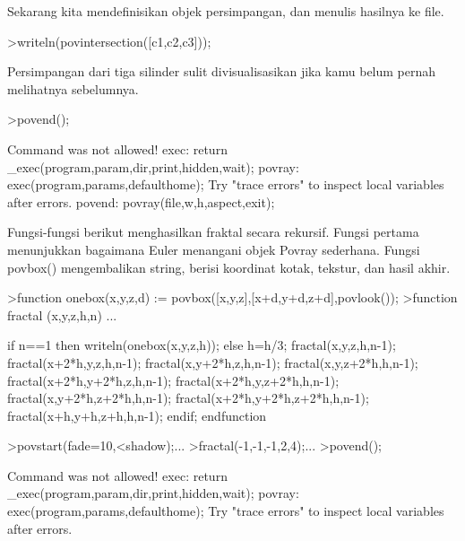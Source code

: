 \documentclass[a4paper,10pt]{article}
\begin{document}
\begin{eulernotebook}
\begin{eulercomment}
\begin{eulercomment}
\begin{euleroutput}
\end{euleroutput}
\begin{eulercomment}
Sekarang kita mendefinisikan objek persimpangan, dan menulis hasilnya
ke file.
\end{eulercomment}
\begin{eulerprompt}
>writeln(povintersection([c1,c2,c3]));
\end{eulerprompt}
\begin{eulercomment}
Persimpangan dari tiga silinder sulit divisualisasikan jika kamu belum
pernah melihatnya sebelumnya.
\end{eulercomment}
\begin{eulerprompt}
>povend();
\end{eulerprompt}
\begin{euleroutput}
  Command was not allowed!
  exec:
      return _exec(program,param,dir,print,hidden,wait);
  povray:
      exec(program,params,defaulthome);
  Try "trace errors" to inspect local variables after errors.
  povend:
      povray(file,w,h,aspect,exit); 
\end{euleroutput}
\begin{eulercomment}
Fungsi-fungsi berikut menghasilkan fraktal secara rekursif. Fungsi
pertama menunjukkan bagaimana Euler menangani objek Povray sederhana.
Fungsi povbox() mengembalikan string, berisi koordinat kotak, tekstur,
dan hasil akhir.
\end{eulercomment}
\begin{eulerprompt}
>function onebox(x,y,z,d) := povbox([x,y,z],[x+d,y+d,z+d],povlook());
>function fractal (x,y,z,h,n) ...
\end{eulerprompt}
\begin{eulerudf}
   if n==1 then writeln(onebox(x,y,z,h));
   else
     h=h/3;
     fractal(x,y,z,h,n-1);
     fractal(x+2*h,y,z,h,n-1);
     fractal(x,y+2*h,z,h,n-1);
     fractal(x,y,z+2*h,h,n-1);
     fractal(x+2*h,y+2*h,z,h,n-1);
     fractal(x+2*h,y,z+2*h,h,n-1);
     fractal(x,y+2*h,z+2*h,h,n-1);
     fractal(x+2*h,y+2*h,z+2*h,h,n-1);
     fractal(x+h,y+h,z+h,h,n-1);
   endif;
  endfunction
\end{eulerudf}
\begin{eulerprompt}
>povstart(fade=10,<shadow);...
>fractal(-1,-1,-1,2,4);...
>povend();
\end{eulerprompt}
\begin{euleroutput}
  Command was not allowed!
  exec:
      return _exec(program,param,dir,print,hidden,wait);
  povray:
      exec(program,params,defaulthome);
  Try "trace errors" to inspect local variables after errors.

\end{euleroutput}
\end{eulercomment}
\end{eulercomment}
\end{eulernotebook}
\end{document}
